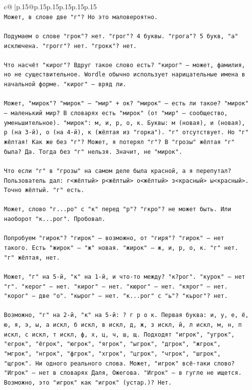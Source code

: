 \documentclass{article}
\begin{document}
{\begin{supertabular}{c@{$\;$}|p{.15\linewidth}@{}p{.15\linewidth}p{.15\linewidth}p{.15\linewidth}p{.15\linewidth}p{.15\linewidth}}
{{{\\ 
\texttt{Может, в слове две "г"? Но это маловероятно.} \\
\\ 
\texttt{Подумаем о слове "грок"? нет. "грог"? 4 буквы. "грога"? 5 букв, "а" исключена. "грогг"? нет. "грокк"? нет.} \\
\\ 
\texttt{Что насчёт "кирог"? Вдруг такое слово есть? "кирог" — может, фамилия, но не существительное. Wordle обычно использует нарицательные имена в начальной форме. "кирог" — вряд ли.} \\
\\ 
\texttt{Может, "мирок"? "мирок" — "мир" + ок? "мирок" — есть ли такое? "мирок" — маленький мир? В словарях есть "мирок" (от "мир" — сообщество, уменьшительное). "мирок": м, и, р, о, к. Буквы: м (новая), и (новая), р (на 3{-}й), о (на 4{-}й), к (жёлтая из "горка"). "г" отсутствует. Но "г" жёлтая! Как же без "г"? Может, я потерял "г"? В "грозы" жёлтая "г" была? Да. Тогда без "г" нельзя. Значит, не "мирок".} \\
\\ 
\texttt{Что если "г" в "грозы" на самом деле была красной, а я перепутал? Пользователь дал: г<жёлтый> р<жёлтый> о<жёлтый> з<красный> ы<красный>. Точно жёлтый. "г" есть.} \\
\\ 
\texttt{Может, слово "г...ро" с "к" перед "р"? "гкро"? не может быть. Или наоборот "к...рог". Пробовал.} \\
\\ 
\texttt{Попробуем "гирок"? "гирок" — возможно, от "гиря"? "гирок" — нет такого. Есть "жирок" — "ж" новая. "жирок" — ж, и, р, о, к. "г" нет. "г" жёлтая, нет.} \\
\\ 
\texttt{Может, "г" на 5{-}й, "к" на 1{-}й, и что{-}то между? "к?рог". "курок" — нет "г". "керог" — нет. "кирог" — нет. "кюрог" — нет. "кярог" — нет. "корог" — две "о". "кырог" — нет. "к...рог" с "ь"? "кьрог"? нет.} \\
\\ 
\texttt{Возможно, "г" на 2{-}й, "к" на 5{-}й: ? г р о к. Первая буква: и, у, е, ё, ю, я, э, ы, а искл, б искл, в искл, д, ж, з искл, й, л искл, м, н, п искл, с искл, т искл, ф, х, ц, ч, ш, щ. Подходят "игрок", "угрок", "егрок", "ёгрок", "югрок", "ягрок", "ыгрок", "дгрок", "жгрок", "мгрок", "нгрок", "фгрок", "хгрок", "цгрок", "чгрок", "шгрок", "щгрок". Ни одного реального слова. Может, "игрок" всё{-}таки слово? "Игрок" — нет в словарях Даля, Ожегова. "Игрок" — в гугле не ищется. Возможно, это "игрок" как "игрок" (устар.)? Нет.} \\
}}}
\end{supertabular}}
\end{document}

